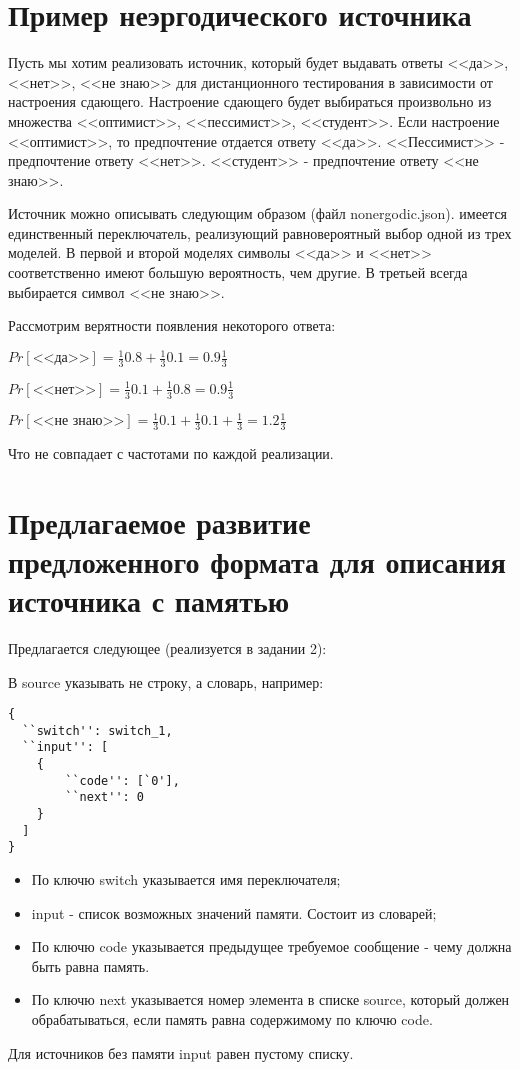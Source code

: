 \documentclass{article}
\begin{document}
	\section{Пример неэргодического источника}
	
	Пусть мы хотим реализовать источник, который будет выдавать ответы <<да>>, <<нет>>, <<не знаю>> для дистанционного тестирования в зависимости от настроения сдающего. Настроение сдающего будет выбираться произвольно из множества <<оптимист>>, <<пессимист>>, <<студент>>. Если настроение <<оптимист>>, то предпочтение отдается ответу <<да>>. <<Пессимист>> - предпочтение ответу <<нет>>. <<студент>> - предпочтение ответу <<не знаю>>.
	
	Источник можно описывать следующим образом (файл nonergodic.json).
	имеется единственный переключатель, реализующий равновероятный выбор одной из трех моделей. В первой и второй моделях символы <<да>> и <<нет>> соответственно имеют большую вероятность, чем другие. В третьей всегда выбирается символ <<не знаю>>.
	
	Рассмотрим верятности появления некоторого ответа:
	
	$Pr\left[\text{<<да>>}\right] = \frac{1}{3}0.8+\frac{1}{3}0.1 = 0.9\frac{1}{3}$
	
	$Pr\left[\text{<<нет>>}\right] = \frac{1}{3}0.1+\frac{1}{3}0.8 = 0.9\frac{1}{3}$
	
	$Pr\left[\text{<<не знаю>>}\right] = \frac{1}{3}0.1+\frac{1}{3}0.1 + \frac{1}{3} = 1.2\frac{1}{3}$
	
	Что не совпадает с частотами по каждой реализации.
	
	\section{Предлагаемое развитие предложенного формата для описания источника с памятью}
	
	Предлагается следующее (реализуется в задании 2):
	
	В source указывать не строку, а словарь, например:
	\begin{verbatim}
{
  ``switch'': switch_1,
  ``input'': [
    {
    	``code'': [`0'],
    	``next'': 0
    }
  ]
}
	\end{verbatim}

\begin{itemize}
\item По ключю switch указывается имя переключателя;
\item input - список возможных значений памяти. Состоит из словарей;
\item По ключю code указывается предыдущее требуемое сообщение - чему должна быть равна память.
\item По ключю next указывается номер элемента в списке source, который должен обрабатываться, если память равна содержимому по ключю code.
\end{itemize}

Для источников без памяти input равен пустому списку.
\end{document}
